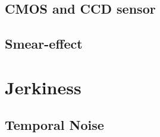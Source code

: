 \subsection{CMOS and CCD sensor}
\subsection{Smear-effect}

\section{Jerkiness}



\subsection{Temporal Noise}




